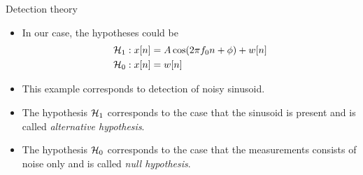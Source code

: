 \documentclass[10pt, aspectratio=169]{beamer} %
\begin{document}
\begin{frame}[allowframebreaks=0.8]
 {Detection theory}
\begin{itemize}
\item In our case, the hypotheses could be
\begin{align*}
{\cal H}_1 &: x[n] = A \cos(2\pi f_0 n + \phi) + w[n]\\
{\cal H}_0 &: x[n] = w[n]
\end{align*}
\item This example corresponds to detection of noisy sinusoid.
\item The hypothesis ${\cal H}_1$ corresponds to the case that the sinusoid
is present and is called \emph{alternative hypothesis}.
\item The hypothesis ${\cal H}_0$ corresponds to the case that the measurements
consists of noise only and is called \emph{null hypothesis}.
\end{itemize}
\end{frame}
\end{document}
